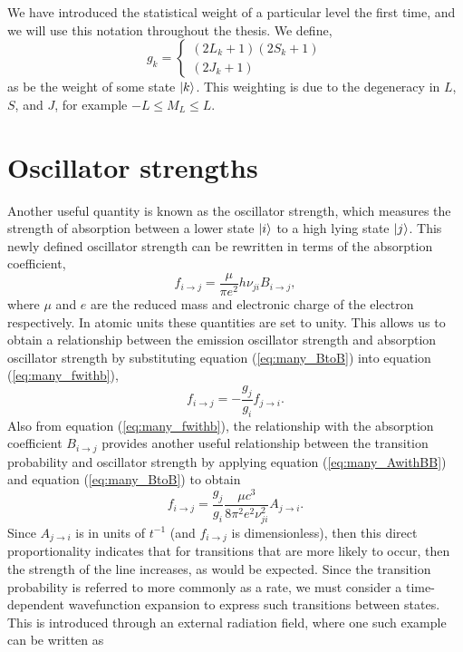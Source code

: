 We have introduced the statistical weight of a particular level the first time, and we will use this notation throughout the thesis. We define,
\begin{equation}\label{eq:many_statweight}
g_k = \left\{
  \begin{array}{lr}
     (2L_k+1)(2S_k+1)\\
    (2J_k+1)
  \end{array}
\right.
\end{equation}
as be the weight of some state $\Ket{k}$. This weighting is due to the degeneracy in $L$, $S$, and $J$, for example $-L\leq M_L\leq L$. 

\section{Oscillator strengths}\label{sec:many_oscillator}
Another useful quantity is known as the oscillator strength, which measures the strength of absorption between a lower state $\Ket{i}$ to a high lying state $\Ket{j}$. This newly defined oscillator strength can be rewritten in terms of the absorption coefficient,
\begin{equation}\label{eq:many_fwithb}
f_{i\rightarrow j} = \frac{\mu}{\pi e^2}h\nu_{ji}B_{i\rightarrow j},
\end{equation}
where $\mu$ and $e$ are the reduced mass and electronic charge of the electron respectively. In atomic units these quantities are set to unity. This allows us to obtain a relationship between the emission oscillator strength and absorption oscillator strength by substituting equation (\ref{eq:many_BtoB}) into equation (\ref{eq:many_fwithb}),
\[
f_{i\rightarrow j} = -\frac{g_j}{g_i}f_{j\rightarrow i}.
\]
Also from equation (\ref{eq:many_fwithb}), the relationship with the absorption coefficient $B_{i \rightarrow j}$ provides another useful relationship between the transition probability and oscillator strength by applying equation (\ref{eq:many_AwithBB}) and equation (\ref{eq:many_BtoB}) to obtain
\begin{equation}\label{eq:many_fijandaij}
f_{i\rightarrow j} = \frac{g_j}{g_i}\frac{\mu c^3}{8\pi^2 e^2 \nu_{ji}^2}A_{j\rightarrow i}.
\end{equation}
Since $A_{j \rightarrow i}$ is in units of $t^{-1}$ (and $f_{i\rightarrow j}$ is dimensionless), then this direct proportionality indicates that for transitions that are more likely to occur, then the strength of the line increases, as would be expected. Since the transition probability is referred to more commonly as a rate, we must consider a time-dependent wavefunction expansion to express such transitions between states. This is introduced through an external radiation field, where one such example can be written as
